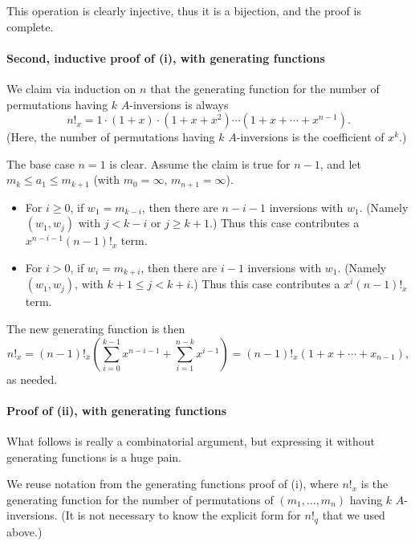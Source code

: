 This operation is clearly injective, thus it is a bijection, and the proof is complete.

\paragraph{Second, inductive proof of (i), with generating functions} We claim via induction on $n$ that the generating function for the number of permutations having $k$ $A$-inversions is always \[n!_x=1\cdot(1+x)\cdot\left(1+x+x^2\right)\cdots\left(1+x+\cdots+x^{n-1}\right).\]
(Here, the number of permutations having $k$ $A$-inversions is the coefficient of $x^k$.)

The base case $n=1$ is clear. Assume the claim is true for $n-1$, and let $m_k\le a_1\le m_{k+1}$ (with $m_0=\infty$, $m_{n+1}=\infty$).
\begin{itemize}
    \item For $i\ge0$, if $w_1=m_{k-i}$, then there are $n-i-1$ inversions with $w_1$. (Namely $(w_1,w_j)$ with $j<k-i$ or $j\ge k+1$.) Thus this case contributes a $x^{n-i-1}(n-1)!_x$ term.
    \item For $i>0$, if $w_i=m_{k+i}$, then there are $i-1$ inversions with $w_1$. (Namely $(w_1,w_j)$, with $k+1\le j<k+i$.) Thus this case contributes a $x^i(n-1)!_x$ term.
\end{itemize}
The new generating function is then \[n!_x=(n-1)!_x\left(\sum_{i=0}^{k-1}x^{n-i-1}+\sum_{i=1}^{n-k}x^{i-1}\right)=(n-1)!_x\left(1+x+\cdots+x_{n-1}\right),\]
as needed.

\paragraph{Proof of (ii), with generating functions} What follows is really a combinatorial argument, but expressing it without generating functions is a huge pain.

We reuse notation from the generating functions proof of (i), where $n!_x$ is the generating function for the number of permutations of $(m_1,\ldots,m_n)$ having $k$ $A$-inversions. (It is not necessary to know the explicit form for $n!_q$ that we used above.)

